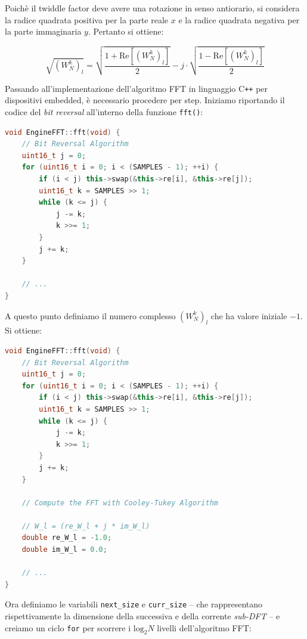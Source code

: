 \documentclass[a4paper,12pt]{report}  %
\newcommand{\lstinlinebg}[1]{\colorbox{backcolour}{\lstinline|#1|}}
\begin{document}
Poichè il twiddle factor deve avere una rotazione in senso antiorario, si considera la radice quadrata positiva per la parte reale $x$ e la radice quadrata negativa per la parte immaginaria $y$.
Pertanto si ottiene:

\begin{equation}
    \label{eq:twiddle_factor}
    \sqrt{\left ( W_N^{k} \right )_l} = \sqrt{\frac{1 + \text{Re}\left [ \left ( W_N^{k} \right )_l \right ]}{2}} - j \cdot \sqrt{\frac{1 - \text{Re}\left [ \left ( W_N^{k} \right )_l \right ]}{2}}
\end{equation}

Passando all'implementazione dell'algoritmo FFT in linguaggio C\texttt{++} per dispositivi embedded, è necessario procedere per step.
Iniziamo riportando il codice del \textit{bit reversal} all'interno della funzione \lstinlinebg{fft()}:

\begin{lstlisting}[language=C++, keywords={void, uint16_t, while, for, if, this}]
void EngineFFT::fft(void) {
    // Bit Reversal Algorithm
    uint16_t j = 0;
    for (uint16_t i = 0; i < (SAMPLES - 1); ++i) {
        if (i < j) this->swap(&this->re[i], &this->re[j]);
        uint16_t k = SAMPLES >> 1;
        while (k <= j) {
            j -= k;
            k >>= 1;
        }
        j += k;
    }

    // ...
}
\end{lstlisting}

A questo punto definiamo il numero complesso $\left ( W_N^{k} \right )_l$ che ha valore iniziale $-1$.
Si ottiene:

\begin{lstlisting}[language=C++, keywords={void, uint16_t, while, for, SAMPLES, if, double, this}]
void EngineFFT::fft(void) {
    // Bit Reversal Algorithm
    uint16_t j = 0;
    for (uint16_t i = 0; i < (SAMPLES - 1); ++i) {
        if (i < j) this->swap(&this->re[i], &this->re[j]);
        uint16_t k = SAMPLES >> 1;
        while (k <= j) {
            j -= k;
            k >>= 1;
        }
        j += k;
    }

    // Compute the FFT with Cooley-Tukey Algorithm

    // W_l = (re_W_l + j * im_W_l)
    double re_W_l = -1.0;
    double im_W_l = 0.0;

    // ...
}
\end{lstlisting}

Ora definiamo le variabili \lstinlinebg{next_size} e \lstinlinebg{curr_size} -- che rappresentano rispettivamente la dimensione della successiva e della corrente \textit{sub-DFT} -- e creiamo un ciclo \lstinlinebg{for} per scorrere i $\text{log}_2 N$ livelli dell'algoritmo FFT:
\end{document}
